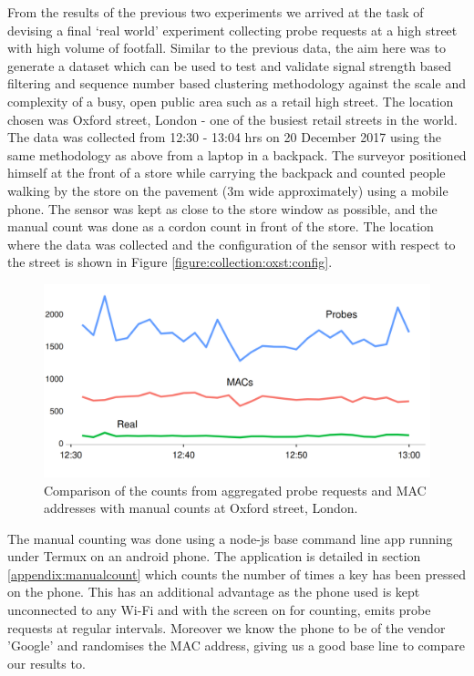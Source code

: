 From the results of the previous two experiments we arrived at the task of devising a final `real world' experiment collecting probe requests at a high street with high volume of footfall.
Similar to the previous data, the aim here was to generate a dataset which can be used to test and validate signal strength based filtering and sequence number based clustering methodology against the scale and complexity of a busy, open public area such as a retail high street.
The location chosen was Oxford street, London - one of the busiest retail streets in the world.
The data was collected from 12:30 - 13:04 hrs on 20 December 2017 using the same methodology as above from a laptop in a backpack.
The surveyor positioned himself at the front of a store while carrying the backpack and counted people walking by the store on the pavement (3m wide approximately) using a mobile phone.
The sensor was kept as close to the store window as possible, and the manual count was done as a cordon count in front of the store.
The location where the data was collected and the configuration of the sensor with respect to the street is shown in Figure \ref{figure:collection:oxst:config}.

\begin{figure}
  \includegraphics[trim={0 0 0 0},clip]{images/oxst-counts.png}
  \caption{Comparison of the counts from aggregated probe requests and MAC addresses with manual counts at Oxford street, London.}
  \label{figure:collection:oxst:initial}
\end{figure}

The manual counting was done using a node-js base command line app running under Termux on an android phone.
The application is detailed in section \ref{appendix:manualcount} which counts the number of times a key has been pressed on the phone.
This has an additional advantage as the phone used is kept unconnected to any Wi-Fi and with the screen on for counting, emits probe requests at regular intervals.
Moreover we know the phone to be of the vendor 'Google' and randomises the MAC address, giving us a good base line to compare our results to.


